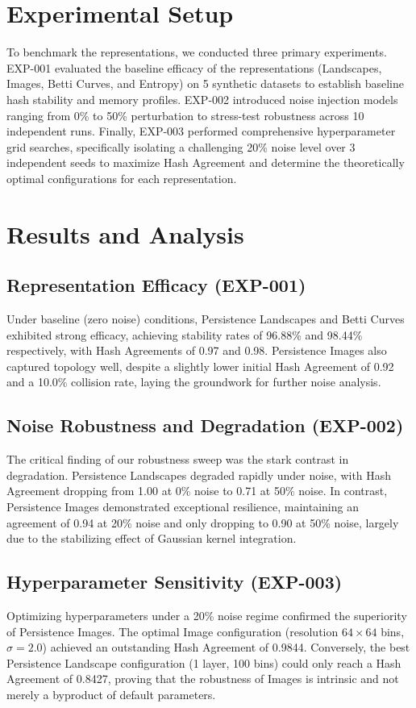 \documentclass[10pt, conference]{IEEEtran}
\begin{document}
\section{Experimental Setup}
To benchmark the representations, we conducted three primary experiments. EXP-001 evaluated the baseline efficacy of the representations (Landscapes, Images, Betti Curves, and Entropy) on 5 synthetic datasets to establish baseline hash stability and memory profiles. EXP-002 introduced noise injection models ranging from 0\% to 50\% perturbation to stress-test robustness across 10 independent runs. Finally, EXP-003 performed comprehensive hyperparameter grid searches, specifically isolating a challenging 20\% noise level over 3 independent seeds to maximize Hash Agreement and determine the theoretically optimal configurations for each representation.

\section{Results and Analysis}
\subsection{Representation Efficacy (EXP-001)}
Under baseline (zero noise) conditions, Persistence Landscapes and Betti Curves exhibited strong efficacy, achieving stability rates of 96.88\% and 98.44\% respectively, with Hash Agreements of 0.97 and 0.98. Persistence Images also captured topology well, despite a slightly lower initial Hash Agreement of 0.92 and a 10.0\% collision rate, laying the groundwork for further noise analysis.
\subsection{Noise Robustness and Degradation (EXP-002)}
The critical finding of our robustness sweep was the stark contrast in degradation. Persistence Landscapes degraded rapidly under noise, with Hash Agreement dropping from 1.00 at 0\% noise to 0.71 at 50\% noise. In contrast, Persistence Images demonstrated exceptional resilience, maintaining an agreement of 0.94 at 20\% noise and only dropping to 0.90 at 50\% noise, largely due to the stabilizing effect of Gaussian kernel integration.
\subsection{Hyperparameter Sensitivity (EXP-003)}
Optimizing hyperparameters under a 20\% noise regime confirmed the superiority of Persistence Images. The optimal Image configuration (resolution $64\times64$ bins, $\sigma=2.0$) achieved an outstanding Hash Agreement of 0.9844. Conversely, the best Persistence Landscape configuration (1 layer, 100 bins) could only reach a Hash Agreement of 0.8427, proving that the robustness of Images is intrinsic and not merely a byproduct of default parameters.
\end{document}
